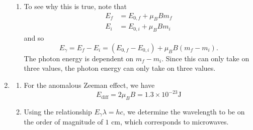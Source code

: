 \documentclass{article}
\begin{document}
\begin{enumerate}[label=(9.\arabic*)]
\begin{enumerate}
        \item To see why this is true, note that
        \begin{align*}
            E_f &= E_{0,f} + \mu_B B m_f \\ 
            E_i &= E_{0,i} + \mu_B Bm_i
        \end{align*}
        and so
        \begin{equation}
            E_\gamma = E_f - E_i = (E_{0,f}-E_{0,i}) + \mu_BB(m_f-m_i).
        \end{equation}
        The photon energy is dependent on $m_f-m_i.$ Since this can only take on three values, the photon energy can only take on three values.
    \end{enumerate}
    \setcounter{enumi}{18}
    \item \begin{enumerate}
        \item For the anomalous Zeeman effect, we have
        \begin{equation}
            E_\text{diff} = 2\mu_BB = 1.3\times 10^{-23}\si{\joule}
        \end{equation}
        \item Using the relationship $E_\gamma\lambda = hc$, we determine the wavelength to be on the order of magnitude of $1\text{ cm}$, which corresponds to microwaves.
    \end{enumerate}
\end{enumerate}
\end{document}
